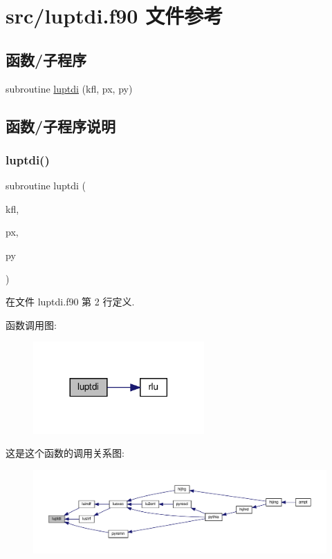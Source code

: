 \hypertarget{luptdi_8f90}{}\section{src/luptdi.f90 文件参考}
\label{luptdi_8f90}
\subsection*{函数/子程序}
\begin{DoxyCompactItemize}
\item 
subroutine \mbox{\hyperlink{luptdi_8f90_a8887b72d29a257d96d4e3a94ad29c3ea}{luptdi}} (kfl, px, py)
\end{DoxyCompactItemize}


\subsection{函数/子程序说明}
\mbox{\label{luptdi_8f90_a8887b72d29a257d96d4e3a94ad29c3ea}} 
\subsubsection{\texorpdfstring{luptdi()}{luptdi()}}
{\footnotesize\ttfamily subroutine luptdi (\begin{DoxyParamCaption}\item[{}]{kfl,  }\item[{}]{px,  }\item[{}]{py }\end{DoxyParamCaption})}



在文件 luptdi.\+f90 第 2 行定义.

函数调用图\+:
\nopagebreak
\begin{figure}[H]
\begin{center}
\leavevmode
\includegraphics[width=185pt]{luptdi_8f90_a8887b72d29a257d96d4e3a94ad29c3ea_cgraph}
\end{center}
\end{figure}
这是这个函数的调用关系图\+:
\nopagebreak
\begin{figure}[H]
\begin{center}
\leavevmode
\includegraphics[width=350pt]{luptdi_8f90_a8887b72d29a257d96d4e3a94ad29c3ea_icgraph}
\end{center}
\end{figure}
